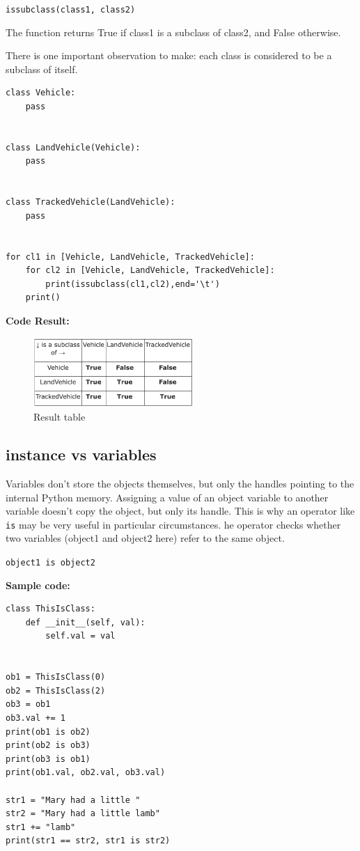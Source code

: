 \documentclass[11pt]{article}
\begin{document}
\texttt{issubclass(class1, class2)}

The function returns True if class1 is a subclass of class2, and False
otherwise.

There is one important observation to make: each class is considered
to be a subclass of itself.

\begin{verbatim}
class Vehicle:
	pass


class LandVehicle(Vehicle):
	pass


class TrackedVehicle(LandVehicle):
	pass


for cl1 in [Vehicle, LandVehicle, TrackedVehicle]:
	for cl2 in [Vehicle, LandVehicle, TrackedVehicle]:
		print(issubclass(cl1,cl2),end='\t')
	print()

\end{verbatim}

\textbf{Code Result:}

\begin{figure}[htbp]
\centering
\includegraphics[width=230px]{./images/subclasses.png}
\caption{Result table}
\end{figure}
\subsection{instance vs variables}
\label{sec:org0bfa1a9}
Variables don’t store the objects themselves, but only the handles
pointing to the internal Python memory. Assigning a value of an object
variable to another variable doesn’t copy the object, but only its
handle. This is why an operator like \texttt{is} may be very useful in
particular circumstances. he operator checks whether two variables
(object1 and object2 here) refer to the same object.

\texttt{object1 is object2}
\vspace{10 mm}

\textbf{Sample code:}

\begin{verbatim}
class ThisIsClass:
	def __init__(self, val):
		self.val = val


ob1 = ThisIsClass(0)
ob2 = ThisIsClass(2)
ob3 = ob1
ob3.val += 1
print(ob1 is ob2)
print(ob2 is ob3)
print(ob3 is ob1)
print(ob1.val, ob2.val, ob3.val)

str1 = "Mary had a little "
str2 = "Mary had a little lamb"
str1 += "lamb"
print(str1 == str2, str1 is str2)

\end{verbatim}
\end{document}
